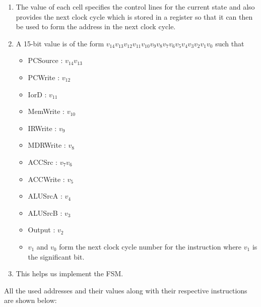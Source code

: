 \documentclass{article}
\begin{document}
\begin{enumerate}
    \item The value of each cell specifies the control lines for the current state and also provides the next clock cycle which is stored in a register so that it can then be used to form the address in the next clock cycle.
    \item A 15-bit value is of the form $v_{14}v_{13}v_{12}v_{11}v_{10}v_9v_8v_7v_6v_5v_4v_3v_2v_1v_0$ such that \begin{itemize}
        \item PCSource : $v_{14}v_{13}$
        \item PCWrite : $v_{12}$
        \item IorD : $v_{11}$
        \item MemWrite : $v_{10}$
        \item IRWrite : $v_{9}$
        \item MDRWrite : $v_{8}$
        \item ACCSrc : $v_{7}v_{6}$
        \item ACCWrite : $v_{5}$
        \item ALUSrcA : $v_{4}$
        \item ALUSrcB : $v_{3}$
        \item Output : $v_{2}$
        \item $v_{1}$ and $v_{0}$ form the next clock cycle number for the instruction where $v_{1}$ is the significant bit.
    \end{itemize}
    \item This helps us implement the FSM.
\end{enumerate}
All the used addresses and their values along with their respective instructions are shown below:
\end{document}
